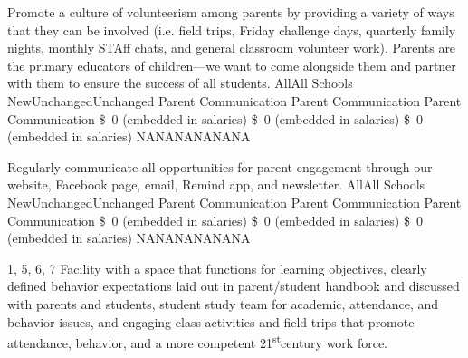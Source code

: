 \documentclass{article}
\newcommand{\st}{\textsuperscript{st}}
\newcommand{\dollar}[1]{\SI{#1}[\$]{}}
\newcounter{goal}[section] %
\newcounter{action}[goal]
\begin{document}
\begin{planactions}
	\planaction
	{Promote a culture of volunteerism among parents by providing a variety of ways that they can be involved (i.e. field trips, Friday challenge days, quarterly family nights, monthly STAff chats, and general classroom volunteer work). Parents are the primary educators of children---we want to come alongside them and partner with them to ensure the success of all students.}
	\planaction@scope
	{All}{All Schools}
	\planaction@action
	{New}{Unchanged}{Unchanged}
	{Parent Communication}
	{Parent Communication}
	{Parent Communication}
	\planaction@budget
	{\dollar{0} (embedded in salaries)}
	{\dollar{0} (embedded in salaries)}
	{\dollar{0} (embedded in salaries)}
	{NA}{NA}{NA}{NA}{NA}{NA}

	\planaction
	{Regularly communicate all opportunities for parent engagement through our website, Facebook page, email, Remind app, and newsletter.}
	\planaction@scope
	{All}{All Schools}
	\planaction@action
	{New}{Unchanged}{Unchanged}
	{Parent Communication}
	{Parent Communication}
	{Parent Communication}
	\planaction@budget
	{\dollar{0} (embedded in salaries)}
	{\dollar{0} (embedded in salaries)}
	{\dollar{0} (embedded in salaries)}
	{NA}{NA}{NA}{NA}{NA}{NA}
\end{planactions}

	{1, 5, 6, 7}
	{}
	{Facility with a space that functions for learning objectives, clearly defined behavior expectations laid out in parent/student handbook and discussed with parents and students, student study team for academic, attendance, and behavior issues, and engaging class activities and field trips that promote attendance, behavior, and a more competent 21\st century work force.}
\end{document}
